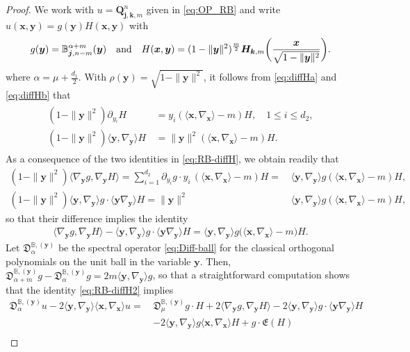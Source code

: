 \documentclass[10pt,a4paper]{amsart}
\def\BB{{\mathbb B}}
\def\a{{\alpha}}
\def\fD{{\mathfrak D}}
\def\fE{{\mathfrak E}}
\def\la{{\langle}}
\def\ra{{\rangle}}
\def\xb{{\bm x}}
\def\yb{{\bm y}}
\begin{document}
\begin{proof}
We work with $u =\bm Q_{\bm j, \bm k, m}^n$ given in \eqref{eq:OP_RB} and write 
$u(\bm x,\bm y) = g(\bm y) H(\bm x,\bm y)$ with 
$$
g(\bm y) = \BB_{\bm j, n-m}^{\a+m}(\bm y) \quad \hbox{and} \quad
  H(\bm x, \bm y) =  (1-\|\bm y\|^2)^{\frac{m}{2}}  
      \bm H_{\bm k, m} \bigg(\frac{\bm x}{\sqrt{1-\|\bm y\|^2}}\bigg).
$$
where $\a = \mu+ \frac{d_1}2$.
With $\rho(\yb) = \sqrt{1-\|\bm y\|^2}$, it follows from \eqref{eq:diffHa} and \eqref{eq:diffHb} that
\begin{align} \label{eq:RB-diffH}
 \begin{split}
    (1-\|\yb\|^2) \partial_{y_i} H \, & = y_i (\la \xb, \nabla_\xb \ra-m) H, \quad 1 \le i \le d_2, \\
    (1-\|\yb\|^2) \la \yb, \nabla_\yb\ra H \,& = \|\yb\|^2 (\la \xb, \nabla_\xb \ra -m) H.
\end{split}
\end{align}
As a consequence of the two identities in \eqref{eq:RB-diffH}, we obtain readily that 
\begin{align*}
   (1-\|\yb\|^2)  \la \nabla_\yb g, \nabla_\yb H \ra  = \sum_{i=1}^{d_2} \partial_{y_i} g \cdot y_i  \,  (\la \xb, \nabla_\xb \ra  -m) H
    =  \, & \la \yb, \nabla_\yb \ra g (\la \xb, \nabla_\xb \ra -m) H, \\
(1-\|\yb\|^2) \la \yb, \nabla_\yb\ra g \cdot \la \yb \nabla_\yb \ra H 
     =  \| \yb\|^2 \, & \la \yb, \nabla_\yb\ra g  (\la \xb, \nabla_\xb \ra -m) H,
\end{align*}
so that their difference implies the identity
\begin{align} \label{eq:RB-diffH2}
 \la \nabla_\yb g, \nabla_\yb H \ra -\la \yb, \nabla_\yb\ra g \cdot \la \yb \nabla_\yb \ra H 
      =  \la \yb, \nabla_\yb \ra g  \big (\la \xb, \nabla_\xb \ra -m \big) H.  
\end{align}
Let $\fD_\a^{\BB, (\yb)}$ be the spectral operator \eqref{eq:Diff-ball} for the classical orthogonal polynomials on 
the unit ball in the variable $\yb$. Then, $\fD_{\a+ m}^{\BB, (\yb)} g - \fD_\a^{\BB, (\yb)} g= 2m  \la \yb, \nabla_\yb \ra g$,
so that a straightforward computation shows that the identity \eqref{eq:RB-diffH2} implies 
\begin{align*}
\fD_\a^{\BB, (\yb)} u -2 \la \yb,\nabla_{\yb} \ra \la \xb,\nabla_{\xb} \ra u 
     = \,& \fD_\mu^{\BB, (\yb)} g \cdot H + 2  \la \nabla_\yb g, \nabla_\yb H \ra 
         - 2 \la \yb, \nabla_\yb\ra g \cdot \la \yb \nabla_\yb \ra H \\
    & -2 \la \yb,\nabla_{\yb} \ra g \la \xb,\nabla_{\xb} \ra H + g \cdot \fE(H) \\

\end{align*}
\end{proof}
\end{document}
